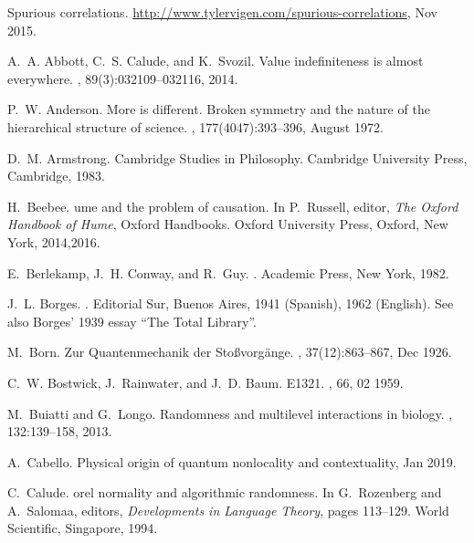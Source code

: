 \documentclass[12pt]{article}
\begin{document}
\begin{thebibliography}{10}

Spurious correlations.
\newblock \url{http://www.tylervigen.com/spurious-correlations}, Nov 2015.

A.~A. Abbott, C.~S. Calude, and K.~Svozil.
\newblock Value indefiniteness is almost everywhere.
, 89(3):032109--032116, 2014.

P.~W. Anderson.
\newblock More is different. {B}roken symmetry and the nature of the
  hierarchical structure of science.
, 177(4047):393--396, August 1972.

D.~M. Armstrong.
\newblock Cambridge Studies in Philosophy. Cambridge University Press,
  Cambridge, 1983.

H.~Beebee.
ume and the problem of causation.
\newblock In P.~Russell, editor, {\em The {O}xford Handbook of {H}ume}, Oxford
  Handbooks. Oxford University Press, Oxford, New York, 2014,2016.

E.~Berlekamp, J.~H. Conway, and R.~Guy.
.
\newblock Academic Press, New York, 1982.

J.~L. Borges.
.
\newblock Editorial Sur, Buenos Aires, 1941 (Spanish), 1962 (English).
\newblock See also Borges' 1939 essay ``The Total Library''.

M.~Born.
\newblock Zur {Q}uantenmechanik der {S}to{\ss}vorg{\"{a}}nge.
, 37(12):863--867, Dec 1926.

C.~W. Bostwick, J.~Rainwater, and J.~D. Baum.
\newblock E1321.
, 66, 02 1959.

M.~Buiatti and G.~Longo.
\newblock Randomness and multilevel interactions in biology.
, 132:139--158, 2013.

A.~Cabello.
\newblock Physical origin of quantum nonlocality and contextuality, Jan 2019.

C.~Calude.
orel normality and algorithmic randomness.
\newblock In G.~Rozenberg and A.~Salomaa, editors, {\em Developments in
  Language Theory}, pages 113--129. World Scientific, Singapore, 1994.


\end{thebibliography}
\end{document}
